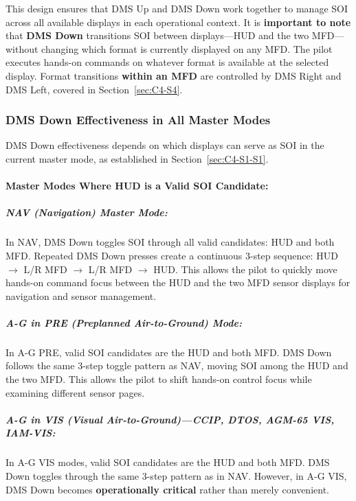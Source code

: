\documentclass[11pt,a4paper]{article}
\begin{document}
This design ensures that DMS Up and DMS Down work together to manage SOI across all available displays in each operational context. It is \textbf{important to note} that \textbf{DMS Down} transitions SOI between displays—HUD and the two MFD—without changing which format is currently displayed on any MFD. The pilot executes hands-on commands on whatever format is available at the selected display. Format transitions \textbf{within an MFD} are controlled by DMS Right and DMS Left, covered in Section~\ref{sec:C4-S4}.


\subsubsection{DMS Down Effectiveness in All Master Modes}
\label{sec:C4-S3-S1}

DMS Down effectiveness depends on which displays can serve as SOI in the current master 
mode, as established in Section~\ref{sec:C4-S1-S1}.

\paragraph{Master Modes Where HUD is a Valid SOI Candidate:}

\subparagraph{NAV (Navigation) Master Mode:}

In NAV, DMS Down toggles SOI through all valid candidates: HUD and both MFD. 
Repeated DMS Down presses create a continuous 3-step sequence: HUD 
$\rightarrow$ L/R MFD $\rightarrow$ L/R MFD $\rightarrow$ HUD. This allows the pilot to 
quickly move hands-on command focus between the HUD and the two MFD sensor displays for 
navigation and sensor management.

\subparagraph{A-G in PRE (Preplanned Air-to-Ground) Mode:}

In A-G PRE, valid SOI candidates are the HUD and both MFD. DMS Down follows the 
same 3-step toggle pattern as NAV, moving SOI among the HUD and the two MFD. This allows the pilot to shift hands-on 
control focus while examining different sensor pages.

\subparagraph{A-G in VIS (Visual Air-to-Ground)---CCIP, DTOS, AGM-65 VIS, IAM-VIS:}

In A-G VIS modes, valid SOI candidates are the HUD and both MFD. DMS Down toggles through 
the same 3-step pattern as in NAV. However, in A-G VIS, DMS Down becomes \textbf{operationally 
critical} rather than merely convenient.
\end{document}
